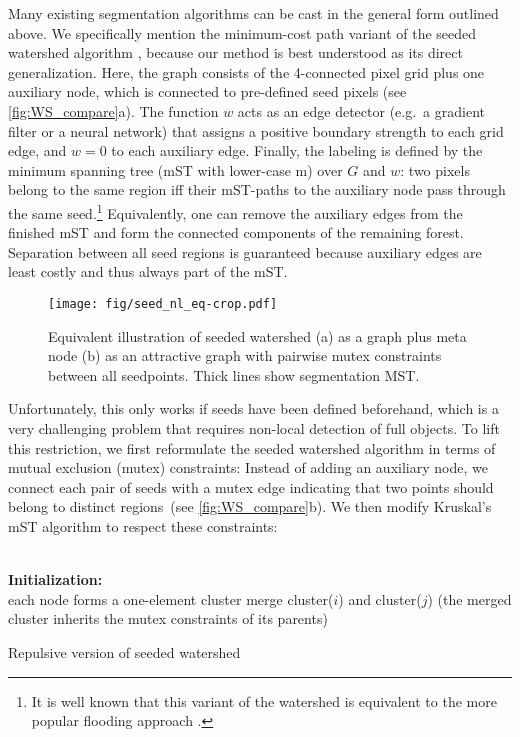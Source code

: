 \noindent Many existing segmentation algorithms can be cast in the general form outlined above. We specifically mention the minimum-cost path variant of the seeded watershed algorithm \cite{falcao2004image}, because our method is best understood as its direct generalization. Here, the graph consists of the 4-connected pixel grid plus one auxiliary node, which is connected to pre-defined seed pixels (see \autoref{fig:WS_compare}a). The function $w$ acts as an edge detector (e.g.\ a gradient filter or a neural network) that assigns a positive boundary strength to each grid edge, and $w=0$ to each auxiliary edge. Finally, the labeling is defined by the minimum spanning tree (mST with lower-case m) over $G$ and $w$: two pixels belong to the same region iff their mST-paths to the auxiliary node pass through the same seed.\footnote{It is well known that this variant of the watershed is equivalent to the more popular flooding approach \cite{watershedcuts, Meyer1994}.} Equivalently, one can remove the auxiliary edges from the finished mST and form the connected components of the remaining forest. Separation between all seed regions is guaranteed because auxiliary edges are least costly and thus always part of the mST.

\begin{figure}[t]
\centering
\texttt{[image: fig/seed\_nl\_eq-crop.pdf]}
   \caption{Equivalent illustration of seeded watershed (a) as a graph plus meta node (b) as an attractive graph with pairwise mutex constraints between all seedpoints. Thick lines show segmentation MST.}
\label{fig:WS_compare}
\end{figure}

Unfortunately, this only works if seeds have been defined beforehand, which is a very challenging problem that requires non-local detection of full objects. To lift this restriction, we first reformulate the seeded watershed algorithm in terms of mutual exclusion (mutex) constraints: Instead of adding an auxiliary node, we connect each pair of seeds with a mutex edge indicating that two points should belong to distinct regions~(see \autoref{fig:WS_compare}b). We then modify Kruskal's mST algorithm to respect these constraints:
\begin{algorithm}[h]
 \hrulefill \\
 \textbf{Initialization:}\\
     each node forms a one-element cluster\;
 {
    {
          merge cluster($i$) and cluster($j$)\;
          (the merged cluster inherits the mutex constraints of its parents)\;
    }
  } \vspace{-6pt}\hrulefill
 \caption{Repulsive version of seeded watershed}
 \label{WS_algo_code}
\end{algorithm}

